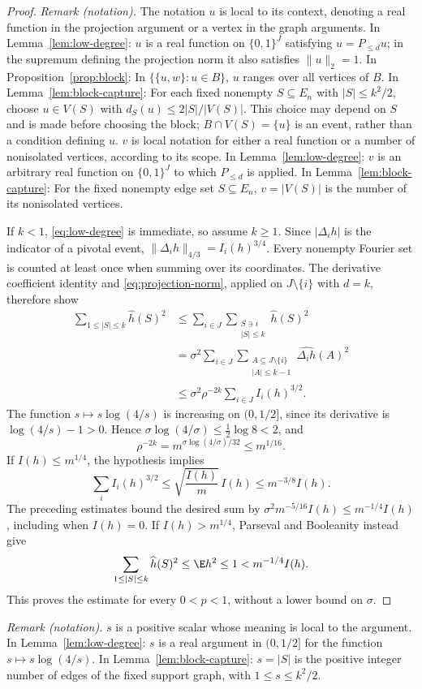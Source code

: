 \begin{proof}
\noindent\textit{Remark (notation).} The notation $u$ is local to its context, denoting a real function in the projection argument or a vertex in the graph arguments. In Lemma~\ref{lem:low-degree}: $u$ is a real function on $\{0,1\}^J$ satisfying $u=P_{\le d}u$; in the supremum defining the projection norm it also satisfies $\|u\|_2=1$. In Proposition~\ref{prop:block}: In $\{\{u,w\}:u\in B\}$, $u$ ranges over all vertices of $B$. In Lemma~\ref{lem:block-capture}: For each fixed nonempty $S\subseteq E_n$ with $|S|\le k^2/2$, choose $u\in V(S)$ with $d_S(u)\le 2|S|/|V(S)|$. This choice may depend on $S$ and is made before choosing the block; $B\cap V(S)=\{u\}$ is an event, rather than a condition defining $u$. $v$ is local notation for either a real function or a number of nonisolated vertices, according to its scope. In Lemma~\ref{lem:low-degree}: $v$ is an arbitrary real function on $\{0,1\}^J$ to which $P_{\le d}$ is applied. In Lemma~\ref{lem:block-capture}: For the fixed nonempty edge set $S\subseteq E_n$, $v=|V(S)|$ is the number of its nonisolated vertices.


If $k<1$, \eqref{eq:low-degree} is immediate, so assume $k\ge1$.
Since $|\Delta_i h|$ is the indicator of a pivotal event,
$\|\Delta_i h\|_{4/3}=I_i(h)^{3/4}$. Every nonempty Fourier set is
counted at least once when summing over its coordinates. The derivative
coefficient identity and \eqref{eq:projection-norm}, applied on
$J\setminus\{i\}$ with $d=k$, therefore show
\begin{align*}
  \sum_{1\le |S|\le k}\widehat h(S)^2
  &\le\sum_{i\in J}\sum_{\substack{S\ni i\\|S|\le k}}
       \widehat h(S)^2\\
  &=\sigma^2\sum_{i\in J}
       \sum_{\substack{A\subseteq J\setminus\{i\}\\|A|\le k-1}}
       \widehat{\Delta_i h}(A)^2\\
  &\le\sigma^2\rho^{-2k}\sum_{i\in J}I_i(h)^{3/2}.
\end{align*}
The function $s\mapsto s\log(4/s)$ is increasing on $(0,1/2]$, since
its derivative is $\log(4/s)-1>0$. Hence
$\sigma\log(4/\sigma)\le\tfrac12\log8<2$, and
\[
  \rho^{-2k}
  =m^{\sigma\log(4/\sigma)/32}\le m^{1/16}.
\]
If $I(h)\le m^{1/4}$, the hypothesis implies
\[
  \sum_i I_i(h)^{3/2}
  \le\sqrt{\frac{I(h)}m}\,I(h)
  \le m^{-3/8}I(h).
\]
The preceding estimates bound the desired sum by
$\sigma^2m^{-5/16}I(h)\le m^{-1/4}I(h)$, including when $I(h)=0$.
If $I(h)>m^{1/4}$, Parseval and Booleanity instead give
\[
  \sum_{1\le |S|\le k}\widehat h(S)^2
  \le\E h^2\le1<m^{-1/4}I(h).
\]
This proves the estimate for every $0<p<1$, without a lower bound on
$\sigma$.
\end{proof}

\noindent\textit{Remark (notation).} $s$ is a positive scalar whose meaning is local to the argument. In Lemma~\ref{lem:low-degree}: $s$ is a real argument in $(0,1/2]$ for the function $s\mapsto s\log(4/s)$. In Lemma~\ref{lem:block-capture}: $s=|S|$ is the positive integer number of edges of the fixed support graph, with $1\le s\le k^2/2$.

